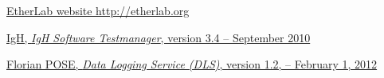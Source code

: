 \begin{thebibliography}{WWW99}

  \href{http://etherlab.org/}{EtherLab website http://etherlab.org }

  \href{http://etherlab.org/download/testmanager/testmanager-getting-started-2012-02-07.pdf}{IgH, \textit{IgH Software Testmanager}, version 3.4 -- September 2010}

  \href{http://etherlab.org/download/dls/dls-1.2-doc-en-2012-02-01.pdf}{Florian POSE, \textit{Data Logging Service (DLS)}, version 1.2, -- February 1, 2012}

\end{thebibliography}
